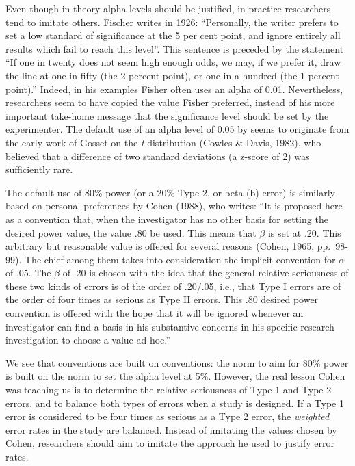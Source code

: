 \documentclass[,jou,floatsintext]{apa6}
\begin{document}
Even though in theory alpha levels should be justified, in practice researchers tend to imitate others. Fischer writes in 1926: \enquote{Personally, the writer prefers to set a low standard of significance at the 5 per cent point, and ignore entirely all results which fail to reach this level}. This sentence is preceded by the statement \enquote{If one in twenty does not seem high enough odds, we may, if we prefer it, draw the line at one in fifty (the 2 percent point), or one in a hundred (the 1 percent point).} Indeed, in his examples Fisher often uses an alpha of 0.01. Nevertheless, researchers seem to have copied the value Fisher preferred, instead of his more important take-home message that the significance level should be set by the experimenter. The default use of an alpha level of 0.05 by seems to originate from the early work of Gosset on the \emph{t}-distribution (Cowles \& Davis, 1982), who believed that a difference of two standard deviations (a z-score of 2) was sufficiently rare.

The default use of 80\% power (or a 20\% Type 2, or beta (b) error) is similarly based on personal preferences by Cohen (1988), who writes: \enquote{It is proposed here as a convention that, when the investigator has no other basis for setting the desired power value, the value .80 be used. This means that \(\beta\) is set at .20. This arbitrary but reasonable value is offered for several reasons (Cohen, 1965, pp.~98-99). The chief among them takes into consideration the implicit convention for \(\alpha\) of .05. The \(\beta\) of .20 is chosen with the idea that the general relative seriousness of these two kinds of errors is of the order of .20/.05, i.e., that Type I errors are of the order of four times as serious as Type II errors. This .80 desired power convention is offered with the hope that it will be ignored whenever an investigator can find a basis in his substantive concerns in his specific research investigation to choose a value ad hoc.}

We see that conventions are built on conventions: the norm to aim for 80\% power is built on the norm to set the alpha level at 5\%. However, the real lesson Cohen was teaching us is to determine the relative seriousness of Type 1 and Type 2 errors, and to balance both types of errors when a study is designed. If a Type 1 error is considered to be four times as serious as a Type 2 error, the \emph{weighted} error rates in the study are balanced. Instead of imitating the values chosen by Cohen, researchers should aim to imitate the approach he used to justify error rates.
\end{document}
